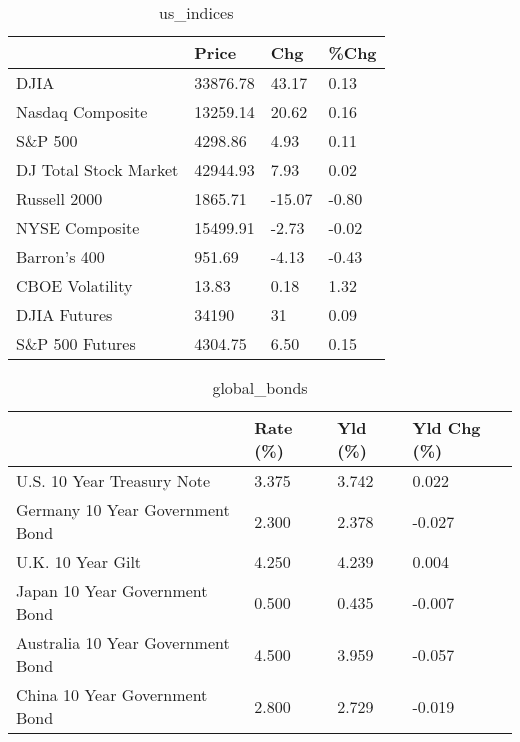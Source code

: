 \documentclass{article}%
\begin{document}
%


\begin{table}[htbp]%
\caption{us\_indices}%
\centering%
\begin{adjustbox}{width=1\textwidth}%
\begin{tabular}{llll}
\toprule
                      &    Price &    Chg &  \%Chg \\
\midrule
                 DJIA & 33876.78 &  43.17 &  0.13 \\
     Nasdaq Composite & 13259.14 &  20.62 &  0.16 \\
              S\&P 500 &  4298.86 &   4.93 &  0.11 \\
DJ Total Stock Market & 42944.93 &   7.93 &  0.02 \\
         Russell 2000 &  1865.71 & -15.07 & -0.80 \\
       NYSE Composite & 15499.91 &  -2.73 & -0.02 \\
         Barron's 400 &   951.69 &  -4.13 & -0.43 \\
      CBOE Volatility &    13.83 &   0.18 &  1.32 \\
         DJIA Futures &    34190 &     31 &  0.09 \\
      S\&P 500 Futures &  4304.75 &   6.50 &  0.15 \\
\bottomrule
\end{tabular}
%
\end{adjustbox}%
\end{table}

%


\begin{table}[htbp]%
\caption{global\_bonds}%
\centering%
\begin{adjustbox}{width=1\textwidth}%
\begin{tabular}{llll}
\toprule
                                  & Rate (\%) & Yld (\%) & Yld Chg (\%) \\
\midrule
       U.S. 10 Year Treasury Note &    3.375 &   3.742 &       0.022 \\
  Germany 10 Year Government Bond &    2.300 &   2.378 &      -0.027 \\
                U.K. 10 Year Gilt &    4.250 &   4.239 &       0.004 \\
    Japan 10 Year Government Bond &    0.500 &   0.435 &      -0.007 \\
Australia 10 Year Government Bond &    4.500 &   3.959 &      -0.057 \\
    China 10 Year Government Bond &    2.800 &   2.729 &      -0.019 \\
\bottomrule
\end{tabular}
%
\end{adjustbox}%
\end{table}
\end{document}
